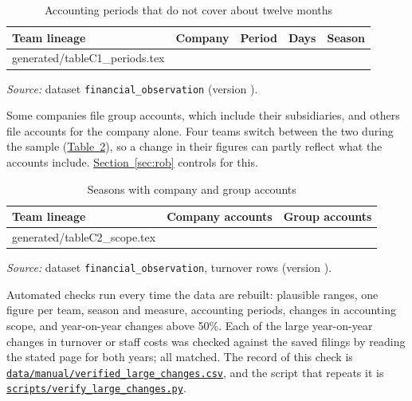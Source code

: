 \documentclass[11pt,a4paper]{article}
\newcommand{\repo}{https://github.com/NahianIbnat-2000/F1-moneyball}
\newcommand{\code}[1]{\href{\repo/blob/main/#1}{\nolinkurl{#1}}}
\begin{document}
\begin{table}[htbp]
\centering
\begin{threeparttable}
\caption{Accounting periods that do not cover about twelve months}
\label{tab:periods}
\footnotesize
\begin{tabularx}{\textwidth}{@{}>{\raggedright\arraybackslash}p{3.6cm}>{\raggedright\arraybackslash}Xlrl@{}}
\toprule
Team lineage & Company & Period & Days & Season \\
\midrule
{} generated/tableC1_periods.tex 
\bottomrule
\end{tabularx}
\begin{tablenotes}[flushleft]\footnotesize
\item \textit{Source:} dataset \texttt{financial\_observation} (version \VerFinancialObservation).
\end{tablenotes}
\end{threeparttable}
\end{table}

Some companies file group accounts, which include their subsidiaries, and others file
accounts for the company alone. Four teams switch between the two during the sample (\hyperref[tab:scope]{Table~\ref*{tab:scope}}), so a change in
their figures can partly reflect what the accounts include. \hyperref[sec:rob]{Section~\ref*{sec:rob}} controls for this.

\begin{table}[htbp]
\centering
\begin{threeparttable}
\caption{Seasons with company and group accounts}
\label{tab:scope}
\footnotesize
\begin{tabularx}{\textwidth}{@{}>{\raggedright\arraybackslash}Xll@{}}
\toprule
Team lineage & Company accounts & Group accounts \\
\midrule
{} generated/tableC2_scope.tex 
\bottomrule
\end{tabularx}
\begin{tablenotes}[flushleft]\footnotesize
\item \textit{Source:} dataset \texttt{financial\_observation}, turnover rows (version \VerFinancialObservation).
\end{tablenotes}
\end{threeparttable}
\end{table}

Automated checks run every time the data are rebuilt: plausible ranges, one figure per team, season and
measure, accounting periods, changes in accounting scope, and year-on-year changes above 50\%. Each of the
\NVerifiedChanges{} large year-on-year changes in turnover or staff costs was checked against the saved filings by reading
the stated page for both years; all matched. The record of this check is \code{data/manual/verified_large_changes.csv}, and
the script that repeats it is \code{scripts/verify_large_changes.py}.
\end{document}
